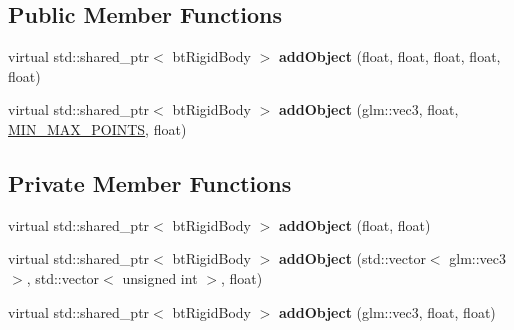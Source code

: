 \subsection*{Public Member Functions}
\begin{DoxyCompactItemize}
\item 
virtual std\+::shared\+\_\+ptr$<$ bt\+Rigid\+Body $>$ {\bfseries add\+Object} (float, float, float, float, float)\hypertarget{class_physics_1_1_cube_physic_object_a91256fe683984587eeaf484f95aece80}{}\label{class_physics_1_1_cube_physic_object_a91256fe683984587eeaf484f95aece80}

\item 
virtual std\+::shared\+\_\+ptr$<$ bt\+Rigid\+Body $>$ {\bfseries add\+Object} (glm\+::vec3, float, \hyperlink{struct_m_i_n___m_a_x___p_o_i_n_t_s}{M\+I\+N\+\_\+\+M\+A\+X\+\_\+\+P\+O\+I\+N\+TS}, float)\hypertarget{class_physics_1_1_cube_physic_object_a48ddcf7df0a08b934779509e39289942}{}\label{class_physics_1_1_cube_physic_object_a48ddcf7df0a08b934779509e39289942}

\end{DoxyCompactItemize}
\subsection*{Private Member Functions}
\begin{DoxyCompactItemize}
\item 
virtual std\+::shared\+\_\+ptr$<$ bt\+Rigid\+Body $>$ {\bfseries add\+Object} (float, float)\hypertarget{class_physics_1_1_cube_physic_object_a4f35f61329030f482bf6e2d2df850431}{}\label{class_physics_1_1_cube_physic_object_a4f35f61329030f482bf6e2d2df850431}

\item 
virtual std\+::shared\+\_\+ptr$<$ bt\+Rigid\+Body $>$ {\bfseries add\+Object} (std\+::vector$<$ glm\+::vec3 $>$, std\+::vector$<$ unsigned int $>$, float)\hypertarget{class_physics_1_1_cube_physic_object_a831e9b82a690bdb822b6ddd0ea81198a}{}\label{class_physics_1_1_cube_physic_object_a831e9b82a690bdb822b6ddd0ea81198a}

\item 
virtual std\+::shared\+\_\+ptr$<$ bt\+Rigid\+Body $>$ {\bfseries add\+Object} (glm\+::vec3, float, float)\hypertarget{class_physics_1_1_cube_physic_object_a35e7b5cfd0181501a5a831caa765112c}{}\label{class_physics_1_1_cube_physic_object_a35e7b5cfd0181501a5a831caa765112c}

\end{DoxyCompactItemize}

